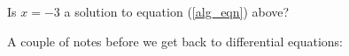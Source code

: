 \documentclass[12pt]{article}
\newcommand{\<}{\langle}
\renewcommand{\>}{\rangle}
\begin{document}
  Is $x = -3$ a solution to equation (\ref{alg_eqn}) above?\\
\vspace{3in}

%
\noindent  A couple of notes before we get back to differential equations:
\end{document}
